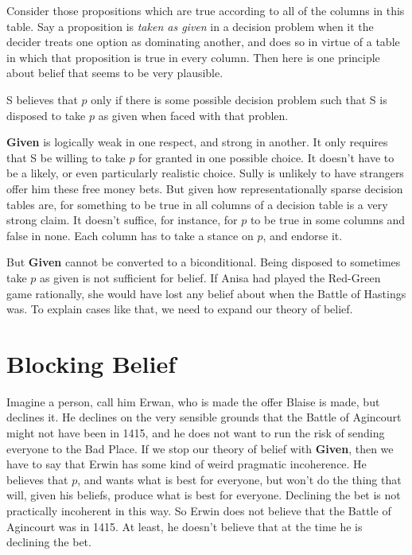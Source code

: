 \documentclass[11pt,]{book}
\providecommand{\tightlist}{%
  \setlength{\itemsep}{0pt}\setlength{\parskip}{0pt}}
\begin{document}
Consider those propositions which are true according to all of the columns in this table. Say a proposition is \emph{taken as given} in a decision problem when it the decider treats one option as dominating another, and does so in virtue of a table in which that proposition is true in every column. Then here is one principle about belief that seems to be very plausible.

\begin{description}
\tightlist
\item[Given]
S believes that \(p\) only if there is some possible decision problem such that S is disposed to take \(p\) as given when faced with that problen.
\end{description}

\textbf{Given} is logically weak in one respect, and strong in another. It only requires that S be willing to take \(p\) for granted in one possible choice. It doesn't have to be a likely, or even particularly realistic choice. Sully is unlikely to have strangers offer him these free money bets. But given how representationally sparse decision tables are, for something to be true in all columns of a decision table is a very strong claim. It doesn't suffice, for instance, for \(p\) to be true in some columns and false in none. Each column has to take a stance on \(p\), and endorse it.

But \textbf{Given} cannot be converted to a biconditional. Being disposed to sometimes take \(p\) as given is not sufficient for belief. If Anisa had played the Red-Green game rationally, she would have lost any belief about when the Battle of Hastings was. To explain cases like that, we need to expand our theory of belief.

\hypertarget{block}{%
\section{Blocking Belief}\label{block}}

Imagine a person, call him Erwan, who is made the offer Blaise is made, but declines it. He declines on the very sensible grounds that the Battle of Agincourt might not have been in 1415, and he does not want to run the risk of sending everyone to the Bad Place. If we stop our theory of belief with \textbf{Given}, then we have to say that Erwin has some kind of weird pragmatic incoherence. He believes that \(p\), and wants what is best for everyone, but won't do the thing that will, given his beliefs, produce what is best for everyone. Declining the bet is not practically incoherent in this way. So Erwin does not believe that the Battle of Agincourt was in 1415. At least, he doesn't believe that at the time he is declining the bet.
\end{document}
